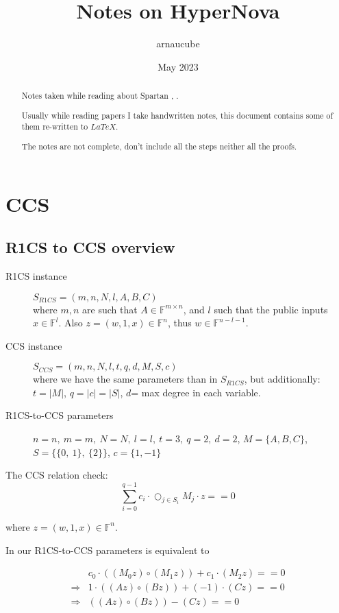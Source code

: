 \documentclass{article}
\title{Notes on HyperNova}
\author{arnaucube}
\date{May 2023}
\theoremstyle{definition}
\begin{document}
\maketitle

\begin{abstract}
	Notes taken while reading about Spartan \cite{cryptoeprint:2023/573}, \cite{cryptoeprint:2023/552}.

	Usually while reading papers I take handwritten notes, this document contains some of them re-written to $LaTeX$.

	The notes are not complete, don't include all the steps neither all the proofs.
\end{abstract}

\tableofcontents


\section{CCS}
\subsection{R1CS to CCS overview}

\begin{description}
	\item[R1CS instance] $S_{R1CS} = (m, n, N, l, A, B, C)$\\
		where $m, n$ are such that $A \in \mathbb{F}^{m \times n}$, and $l$ such that the public inputs $x \in \mathbb{F}^l$. Also $z=(w, 1, x) \in \mathbb{F}^n$, thus $w \in \mathbb{F}^{n-l-1}$.
	\item[CCS instance] $S_{CCS} = (m, n, N, l, t, q, d, M, S, c)$\\
		where we have the same parameters than in $S_{R1CS}$, but additionally:\\
		$t=|M|$, $q = |c| = |S|$, $d$= max degree in each variable.
	\item[R1CS-to-CCS parameters] $n=n,~ m=m,~ N=N,~ l=l,~ t=3,~ q=2,~ d=2$, $M=\{A,B,C\}$, $S=\{\{0,~1\},~ \{2\}\}$, $c=\{1,-1\}$
\end{description}

The CCS relation check:
$$\sum_{i=0}^{q-1} c_i \cdot \bigcirc_{j \in S_i} M_j \cdot z ==0$$

where $z=(w, 1, x) \in \mathbb{F}^n$.

In our R1CS-to-CCS parameters is equivalent to

\begin{align*}
	&c_0 \cdot ( (M_0 z) \circ (M_1 z) ) + c_1 \cdot (M_2 z) ==0\\
	\Longrightarrow &1 \cdot ( (A z) \circ (B z) ) + (-1) \cdot (C z) ==0\\
	\Longrightarrow &( (A z) \circ (B z) ) - (C z) ==0
\end{align*}
\end{document}
